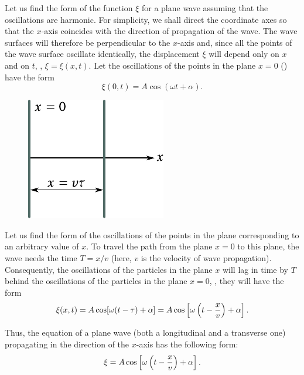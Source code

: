 Let us find the form of the function $\xi$ for a plane wave assuming that the oscillations are harmonic.
For simplicity, we shall direct the coordinate axes so that the $x$-axis coincides with the direction of propagation of the wave.
The wave surfaces will therefore be perpendicular to the $x$-axis and, since all the points of the wave surface oscillate identically, the displacement $\xi$ will depend only on $x$ and on $t$, \ie, $\xi=\xi(x,t)$.
Let the oscillations of the points in the plane $x=0$ () have the form
\begin{equation*}
    \xi(0,t) = A \cos(\omega t + \alpha).
\end{equation*}

\begin{figure}[t]
	\begin{center}
		\includegraphics[scale=1]{figures/ch_14/fig_14_4.pdf}
		\caption[]{}
		\label{fig:14_4}
	\end{center}
	\vspace{-0.85cm}
\end{figure}

\noindent
Let us find the form of the oscillations of the points in the plane corresponding to an arbitrary value of $x$.
To travel the path from the plane $x=0$ to this plane, the wave needs the time $T=x/v$ (here, $v$ is the velocity of wave propagation).
Consequently, the oscillations of the particles in the plane $x$ will lag in time by $T$ behind the oscillations of the particles in the plane $x=0$, \ie, they will have the form
\begin{equation*}
    \xi(x,t) = A \cos[\omega(t - \tau) + \alpha] = A \cos\left[ \omega \left(t - \frac{x}{v}\right) + \alpha\right].
\end{equation*}

Thus, the equation of a plane wave (both a longitudinal and a transverse one) propagating in the direction of the $x$-axis has the following form:
\begin{equation}\label{eq:14_4}
    \xi = A \cos\left[ \omega \left(t - \frac{x}{v}\right) + \alpha\right].
\end{equation}

